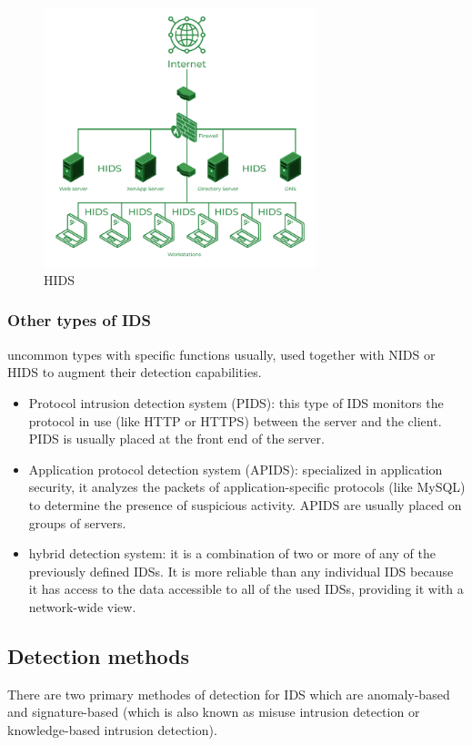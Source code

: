 \begin{figure}[h]
	\centering
	\includegraphics[width=300px]{figures/HIDS.png}
	\caption{HIDS \cite{geeksforgeeks}}
	\label{fig:HIDS}
\end{figure}



\subsubsection{Other types of IDS}
uncommon types with specific functions usually, used together with NIDS or HIDS to augment their detection capabilities.

\firmlist
\begin{itemize}
	\item Protocol intrusion detection system (PIDS): this type of IDS monitors the protocol in use (like HTTP or HTTPS) between the server and the client. PIDS is usually placed at the front end of the server. \cite{geeksforgeeks}


	\item Application protocol detection system (APIDS): specialized in application security, it analyzes the packets of application-specific protocols (like MySQL) to determine the presence of suspicious activity. APIDS are usually placed on groups of servers. \cite{geeksforgeeks}
	

	\item hybrid detection system: it is a combination of two or more of any of the previously defined IDSs. It is more reliable than any individual IDS because it has access to the data accessible to all of the used IDSs, providing it with a network-wide view.
	\cite{geeksforgeeks}
\end{itemize}




\subsection{Detection methods}
There are two primary methodes of detection for IDS which are anomaly-based and signature-based (which is also known as misuse intrusion detection or knowledge-based intrusion detection). \cite{ids-classification}



